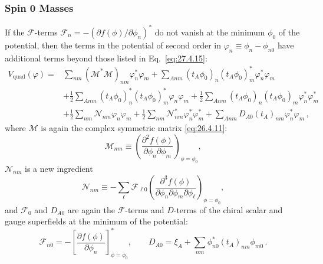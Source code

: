 \subsubsection*{Spin 0 Masses}

If the \(\mathcal{F}\)-terms
\(\mathcal{F}_n=-(\partial f(\phi)/\partial\phi_n)^*\) do not vanish at the
minimum \(\phi_0\) of the potential, then the terms in the potential of
second order in \(\varphi_n\equiv\phi_n-\phi_{n0}\) have additional terms
beyond those listed in Eq.~\eqref{eq:27.4.15}:
\begin{equation}
  \begin{aligned}
  V_{\mathrm{quad}}(\varphi)={}&
  \sum_{nm}(\mathcal{M}^*\mathcal{M})_{nm}\varphi_n^*\varphi_m
  +\sum_{Anm}(t_A\phi_0)_n(t_A\phi_0)_m^*
    \varphi_n^*\varphi_m
  \\
  &+\frac12\sum_{Anm}(t_A\phi_0)_n^*(t_A\phi_0)_m^*
    \varphi_n\varphi_m
  +\frac12\sum_{Anm}(t_A\phi_0)_n(t_A\phi_0)_m
    \varphi_n^*\varphi_m^*
  \\
  &+\frac12\sum_{nm}\mathcal{N}_{nm}\varphi_n\varphi_m
  +\frac12\sum_{nm}\mathcal{N}_{nm}^*\varphi_n^*\varphi_m^*
  +\sum_{Anm}D_{A0}(t_A)_{nm}\varphi_n^*\varphi_m\,,
  \end{aligned}
  \tag{27.5.2}\label{eq:27.5.2}
\end{equation}
where \(\mathcal{M}\) is again the complex symmetric matrix
\eqref{eq:26.4.11}:
\[
  \mathcal{M}_{nm}\equiv
  \left(
    \frac{\partial^2f(\phi)}{\partial\phi_n\partial\phi_m}
  \right)_{\phi=\phi_0},
\]
\(\mathcal{N}_{nm}\) is a new ingredient
\begin{equation}
  \mathcal{N}_{nm}\equiv
  -\sum_\ell\mathcal{F}_{\ell0}
  \left(
    \frac{\partial^3f(\phi)}
    {\partial\phi_n\partial\phi_m\partial\phi_\ell}
  \right)_{\phi=\phi_0},
  \tag{27.5.3}\label{eq:27.5.3}
\end{equation}
and \(\mathcal{F}_0\) and \(D_{A0}\) are again the
\(\mathcal{F}\)-terms and \(D\)-terms of the chiral scalar and gauge
superfields at the minimum of the potential:
\[
  \mathcal{F}_{n0}
  =-\left[
    \frac{\partial f(\phi)}{\partial\phi_n}
  \right]^*_{\phi=\phi_0},
  \qquad
  D_{A0}
  =\xi_A+\sum_{nm}\phi_{n0}^*(t_A)_{nm}\phi_{m0}\,.
\]

